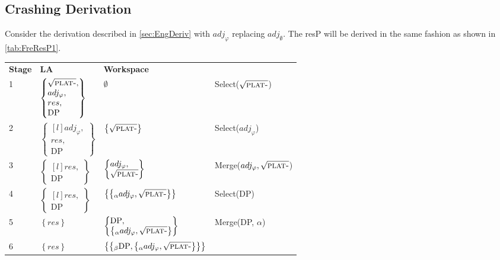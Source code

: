 \documentclass[MilwayThesis]{subfiles}
\begin{document}
\subsection{Crashing Derivation}\label{sec:crash}
Consider the derivation described in \autoref{sec:EngDeriv} with $adj_\varphi$ replacing $adj_\emptyset$.
The resP will be derived in the same fashion as shown in \autoref{tab:FreResP1}.
\begin{longtabu}{llll}
	\textbf{Stage} & \textbf{LA} & \textbf{Workspace} & \\
	1 & $
	\begin{Bmatrix*}[l]
		\sqrt{\textsc{plat-}},\\
		adj_\varphi,\\
		res,\\
		\text{DP}
	\end{Bmatrix*}
	$ & $\emptyset$ & Select($\sqrt{\textsc{plat-}}$)\\
	2 & $
	\begin{Bmatrix*}[l]
		adj_\varphi,\\
		res,\\
		\text{DP}
	\end{Bmatrix*}
	$ & $\left\{\sqrt{\textsc{plat-}}\right\}$ & Select($adj_\varphi$)\\
	3 & $
	\begin{Bmatrix*}[l]
		res,\\
		\text{DP}
	\end{Bmatrix*}
	$ & $
	\begin{Bmatrix*}[l]
		adj_\varphi,\\
		\sqrt{\textsc{plat-}}
	\end{Bmatrix*}$
	& Merge($adj_\varphi, \sqrt{\textsc{plat-}}$)\\
	4 & $
	\begin{Bmatrix*}[l]
		res,\\
		\text{DP}
	\end{Bmatrix*}
	$ & $\left\{ \left\{_\alpha adj_\varphi, \sqrt{\textsc{plat-}} \right\} \right\}$ & Select(DP)\\
	5 & $\left\{ res \right\}$ & $
	\begin{Bmatrix*}[l]
		\text{DP},\\
		\left\{_\alpha adj_\varphi, \sqrt{\textsc{plat-}} \right\}
	\end{Bmatrix*}
	$ & Merge(DP, $\alpha$)\\
	6 & $\left\{ res \right\}$ & $ \left\{ \left\{_\beta \text{DP}, \left\{_\alpha adj_\varphi, \sqrt{\textsc{plat-}} \right\} \right\} \right\}$ &

\end{longtabu}
\end{document}
